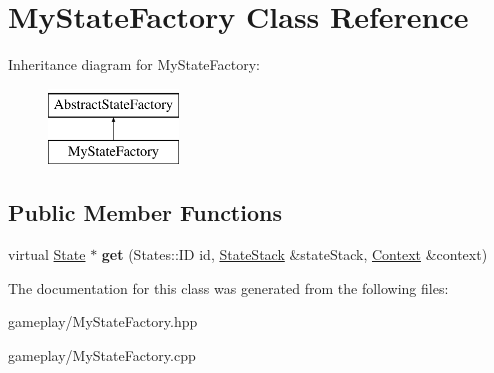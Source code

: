 \hypertarget{classMyStateFactory}{\section{\-My\-State\-Factory \-Class \-Reference}
\label{classMyStateFactory}
}
\-Inheritance diagram for \-My\-State\-Factory\-:\begin{figure}[H]
\begin{center}
\leavevmode
\includegraphics[height=2.000000cm]{classMyStateFactory}
\end{center}
\end{figure}
\subsection*{\-Public \-Member \-Functions}
\begin{DoxyCompactItemize}
\item 
\hypertarget{classMyStateFactory_a2e8344ad4c8aa6ffb65c359dbb034cd7_a2e8344ad4c8aa6ffb65c359dbb034cd7}{virtual \hyperlink{classState}{\-State} $\ast$ {\bfseries get} (\-States\-::\-I\-D id, \hyperlink{classStateStack}{\-State\-Stack} \&state\-Stack, \hyperlink{classContext}{\-Context} \&context)}\label{classMyStateFactory_a2e8344ad4c8aa6ffb65c359dbb034cd7_a2e8344ad4c8aa6ffb65c359dbb034cd7}

\end{DoxyCompactItemize}


\-The documentation for this class was generated from the following files\-:\begin{DoxyCompactItemize}
\item 
gameplay/\-My\-State\-Factory.\-hpp\item 
gameplay/\-My\-State\-Factory.\-cpp\end{DoxyCompactItemize}
